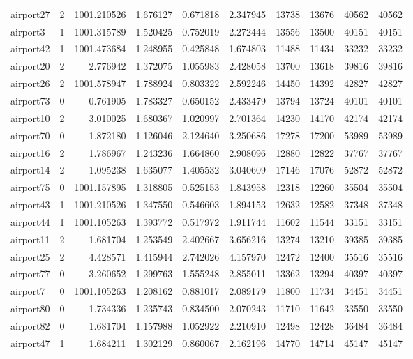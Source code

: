 \begin{longtable}{|l|r|r|r|r|r|r|r|r|r|}
airport27 & 2 & 1001.210526 & 1.676127 & 0.671818 & 2.347945 & 13738 & 13676 & 40562 & 40562 \\
airport3 & 1 & 1001.315789 & 1.520425 & 0.752019 & 2.272444 & 13556 & 13500 & 40151 & 40151 \\
airport42 & 1 & 1001.473684 & 1.248955 & 0.425848 & 1.674803 & 11488 & 11434 & 33232 & 33232 \\
airport20 & 2 & 2.776942 & 1.372075 & 1.055983 & 2.428058 & 13700 & 13618 & 39816 & 39816 \\
airport26 & 2 & 1001.578947 & 1.788924 & 0.803322 & 2.592246 & 14450 & 14392 & 42827 & 42827 \\
airport73 & 0 & 0.761905 & 1.783327 & 0.650152 & 2.433479 & 13794 & 13724 & 40101 & 40101 \\
airport10 & 2 & 3.010025 & 1.680367 & 1.020997 & 2.701364 & 14230 & 14170 & 42174 & 42174 \\
airport70 & 0 & 1.872180 & 1.126046 & 2.124640 & 3.250686 & 17278 & 17200 & 53989 & 53989 \\
airport16 & 2 & 1.786967 & 1.243236 & 1.664860 & 2.908096 & 12880 & 12822 & 37767 & 37767 \\
airport14 & 2 & 1.095238 & 1.635077 & 1.405532 & 3.040609 & 17146 & 17076 & 52872 & 52872 \\
airport75 & 0 & 1001.157895 & 1.318805 & 0.525153 & 1.843958 & 12318 & 12260 & 35504 & 35504 \\
airport43 & 1 & 1001.210526 & 1.347550 & 0.546603 & 1.894153 & 12632 & 12582 & 37348 & 37348 \\
airport44 & 1 & 1001.105263 & 1.393772 & 0.517972 & 1.911744 & 11602 & 11544 & 33151 & 33151 \\
airport11 & 2 & 1.681704 & 1.253549 & 2.402667 & 3.656216 & 13274 & 13210 & 39385 & 39385 \\
airport25 & 2 & 4.428571 & 1.415944 & 2.742026 & 4.157970 & 12472 & 12400 & 35516 & 35516 \\
airport77 & 0 & 3.260652 & 1.299763 & 1.555248 & 2.855011 & 13362 & 13294 & 40397 & 40397 \\
airport7 & 0 & 1001.105263 & 1.208162 & 0.881017 & 2.089179 & 11800 & 11734 & 34451 & 34451 \\
airport80 & 0 & 1.734336 & 1.235743 & 0.834500 & 2.070243 & 11710 & 11642 & 33550 & 33550 \\
airport82 & 0 & 1.681704 & 1.157988 & 1.052922 & 2.210910 & 12498 & 12428 & 36484 & 36484 \\
airport47 & 1 & 1.684211 & 1.302129 & 0.860067 & 2.162196 & 14770 & 14714 & 45147 & 45147 \\

\end{longtable}
